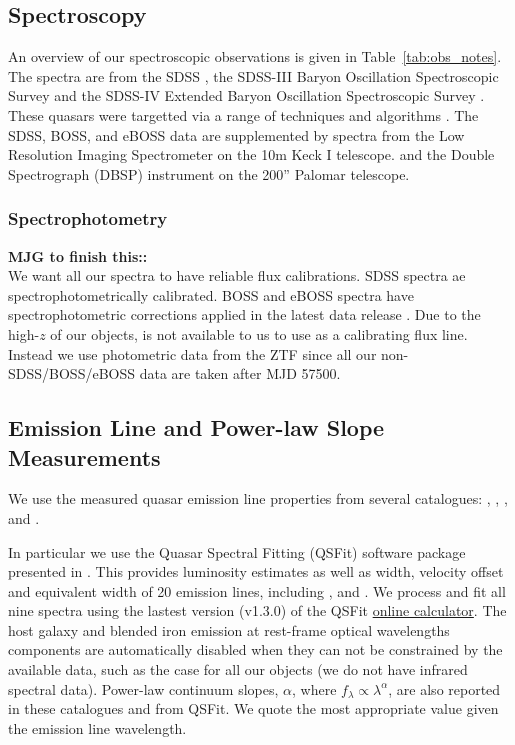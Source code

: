 \documentclass[a4paper,fleqn,usenatbib]{mnras}
\begin{document}
\subsection{Spectroscopy}
An overview of our spectroscopic observations is given in
Table~\ref{tab:obs_notes}.  The spectra are from the SDSS
\citep{Stoughton2002, DR7, Schneider2010}, the SDSS-III Baryon
Oscillation Spectroscopic Survey \citep[BOSS; ][]{Eisenstein2011,
Dawson2013, Smee2013, Alam2015, Paris2017} and the SDSS-IV Extended
Baryon Oscillation Spectroscopic Survey \citep[eBOSS; ][]{Dawson2016,
Abolfathi2018, Paris2018}.  These quasars were targetted via a range
of techniques and algorithms \citep[see ][]{Richards2002, Ross2012,
Myers2015}. The SDSS, BOSS, and eBOSS data are supplemented by
spectra from the Low Resolution Imaging Spectrometer \citep[LRIS; ][]{Oke1995} on the 10m
Keck {\sc I} telescope.  and the Double Spectrograph
(DBSP) instrument on the 200'' Palomar telescope.

\subsubsection{Spectrophotometry}
{\bf MJG to finish this::} \\
We want all our spectra to have reliable flux calibrations.  SDSS
spectra ae spectrophotometrically calibrated.  BOSS and eBOSS spectra
have spectrophotometric corrections applied in the latest data release
\citep{Hutchinson2016, Jensen2016, Margala2016}.  Due to the high-$z$
of our objects, \oiii is not available to us to use as a calibrating
flux line. Instead we use photometric data from the ZTF since all our
non-SDSS/BOSS/eBOSS data are taken after MJD 57500.


\subsection{Emission Line and Power-law Slope Measurements}
We use the measured quasar emission line properties from several catalogues: 
\citet{Shen2011}, \citet{Hamann2017}, \citet{Kozlowski2017}, and
\citet{Calderone2017}.

In particular we use the Quasar Spectral Fitting (QSFit) software
package presented in \citet{Calderone2017}. This provides luminosity
estimates as well as width, velocity offset and equivalent width of 20
emission lines, including \civ, \ciii and \mgii.  We process and fit
all nine spectra using the lastest version (v1.3.0) of the QSFit 
\href{https://qsfit.inaf.it/cat_1.30/onlinefit.php}{online
calculator}.
The host galaxy and blended iron emission at rest-frame optical
wavelengths components are automatically disabled when they can not be
constrained by the available data, such as the case for all our
objects (we do not have infrared spectral data).
Power-law continuum slopes, $\alpha$, where $f_{\lambda} \propto
\lambda^{\alpha}$, are also reported in these catalogues and from
QSFit.  We quote the most appropriate value given the emission line
wavelength.
\end{document}
